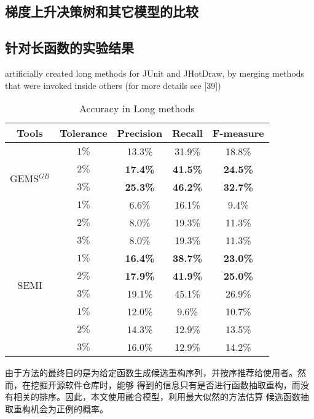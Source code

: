 \subsection{梯度上升决策树和其它模型的比较}\label{RQ3}

\subsection{针对长函数的实验结果}\label{RQ4}
artificially created long methods for JUnit and JHotDraw, by merging methods that were invoked
inside others (for more details see [39])

\begin{table}[!t]
  \scriptsize
  \renewcommand{\arraystretch}{1.3}
  \caption{Accuracy in Long methods}
  \label{long_methods}
  \centering
  \begin{tabular}{cc|ccc}
  \toprule
   Tools &Tolerance &Precision &Recall &F-measure\\ 
  \hline
  \multirow{4}{*}{GEMS$^{GB}$}&$1\%$ &13.3\% &31.9\% &18.8\% \\ 
  &$2\%$ &\bf{17.4\%} &\bf{41.5\%} &\bf{24.5\%} \\ 
  &$3\%$ &\bf{25.3\%} &\bf{46.2\%} &\bf{32.7\%} \\ 
  \hline
  \multirow{4}{*}{JExtract}&$1\%$ &6.6\% &16.1\% &9.4\% \\ 
  &$2\%$ &8.0\% &19.3\% &11.3\% \\ 
  &$3\%$ &8.0\% &19.3\% &11.3\% \\ 
  \hline
  \multirow{4}{*}{SEMI}&$1\%$ &\bf{16.4\%} &\bf{38.7\%} &\bf{23.0\%} \\ 
  &$2\%$ &\bf{17.9\%} &\bf{41.9\%} &\bf{25.0\%} \\ 
  &$3\%$ &19.1\% &45.1\% &26.9\% \\ 
  \hline
  \multirow{4}{*}{JDeodorant}&$1\%$ &12.0\% &9.6\% &10.7\% \\
  &$2\%$ &14.3\% &12.9\% &13.5\% \\ 
  &$3\%$ &16.0\% &12.9\% &14.2\% \\ 
  \bottomrule
  \end{tabular}
  \end{table}
  
由于方法的最终目的是为给定函数生成候选重构序列，并按序推荐给使用者。然而，在挖掘开源软件仓库时，能够
得到的信息只有是否进行函数抽取重构，而没有相关的排序。因此，本文使用融合模型，利用最大似然的方法估算
候选函数抽取重构机会为正例的概率。

